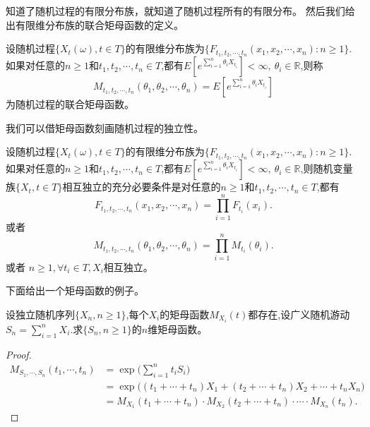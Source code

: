 \documentclass[lang=cn,10pt]{elegantbook}
\begin{document}
	知道了随机过程的有限分布族，就知道了随机过程所有的有限分布。
	然后我们给出有限维分布族的联合矩母函数的定义。
	\begin{definition}[联合矩母函数]
		设随机过程\(\{X_t(\omega),t\in T\}\)的有限维分布族为\(\{F_{t_1,t_2,\cdots,t_n}(x_1,x_2,\cdots,x_n):n\ge 1\}\).如果对任意的\(n\ge 1\)和\(t_1,t_2,\cdots,t_n\in T\),都有\(E[e^{\sum_{i=1}^{n}\theta_iX_{t_i}}]<\infty,\ \theta_i\in \mathbb{R}\),则称
		\[M_{t_1,t_2,\cdots,t_n}(\theta_1,\theta_2,\cdots,\theta_n)=E[e^{\sum_{i=1}^{n}\theta_iX_{t_i}}]\]
		为随机过程的联合矩母函数。
	\end{definition}
	我们可以借矩母函数刻画随机过程的独立性。
	\begin{proposition}[随机过程的独立性]
		设随机过程\(\{X_t(\omega),t\in T\}\)的有限维分布族为\(\{F_{t_1,t_2,\cdots,t_n}(x_1,x_2,\cdots,x_n):n\ge 1\}\).如果对任意的\(n\ge 1\)和\(t_1,t_2,\cdots,t_n\in T\),都有\(E[e^{\sum_{i=1}^{n}\theta_iX_{t_i}}]<\infty,\ \theta_i\in \mathbb{R}\),则随机变量族\(\{X_t,t\in T\}\)相互独立的充分必要条件是对任意的\(n\ge 1\)和\(t_1,t_2,\cdots,t_n\in T\),都有
		\[F_{t_1,t_2,\cdots,t_n}(x_1,x_2,\cdots,x_n)=\prod_{i=1}^{n}F_{t_i}(x_i).\]
		或者
		\[M_{t_1,t_2,\cdots,t_n}(\theta_1,\theta_2,\cdots,\theta_n)=\prod_{i=1}^{n}M_{t_i}(\theta_i).\]
		或者
		\(n\ge 1,\forall t_i\in T,X_i\)相互独立。
	\end{proposition}
	下面给出一个矩母函数的例子。
	\begin{example}
		设独立随机序列\(\{X_n,n\ge 1\}\),每个\(X_i\)的矩母函数\(M_{X_i}(t)\)都存在,设广义随机游动\(S_n=\sum_{i=1}^{n}X_i\).求\(\{S_n,n\ge 1\}\)的\(n\)维矩母函数。
	\end{example}
\begin{proof}
\begin{align*}
M_{S_1,\cdots,S_n}(t_1,\cdots,t_n) 
  &= \exp\!\Big( \sum_{i=1}^{n} t_i S_i \Big) \\
  &= \exp\!\Big( (t_1+\cdots+t_n)X_1 
               + (t_2+\cdots+t_n)X_2 
               + \cdots + t_n X_n \Big) \\
  &= M_{X_1}(t_1+\cdots+t_n)\cdot
     M_{X_2}(t_2+\cdots+t_n)\cdot
     \cdots \cdot
     M_{X_n}(t_n).
\end{align*}
\end{proof}
\end{document}
